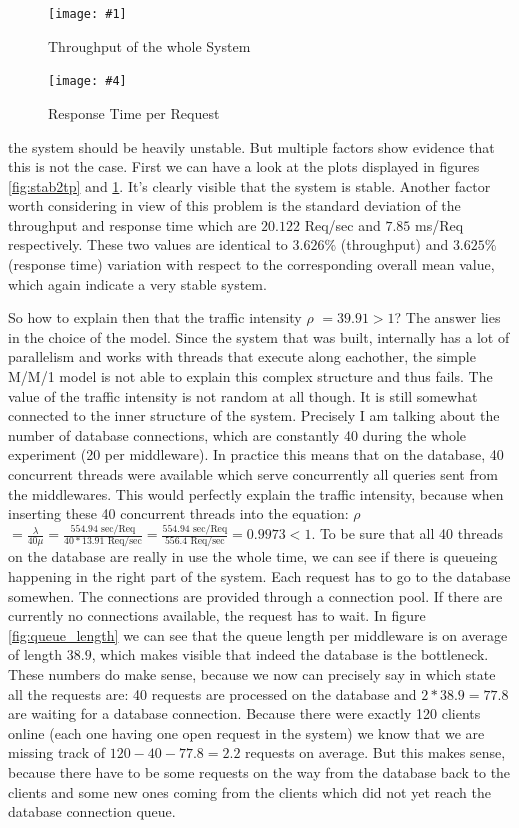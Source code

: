 \documentclass[11pt]{article}
\newcommand\TwoFig[6]{%
	\sbox\IBoxA{\texttt{[image: \#1]}}
	\sbox\IBoxB{\texttt{[image: \#4]}}%
	\ifdim\ht\IBoxA>\ht\IBoxB
	\setlength\IHeight{\ht\IBoxB}\else\setlength\IHeight{\ht\IBoxA}\fi%
	\begin{figure}[!htb]
		\minipage[t]{0.5\textwidth}\centering
		\texttt{[image: \#1]}
		\caption{#2}\label{#3}
		\endminipage \hfill
		\minipage[t]{0.5\textwidth}\centering
		\texttt{[image: \#4]}
		\caption{#5}\label{#6}
		\endminipage
	\end{figure}%
}
\begin{document}
\TwoFig {figures/stability_2/tp.eps} {Throughput of the whole System} {fig:stab2tp}
		{figures/stability_2/rt.eps} {Response Time per Request} {fig:stab2rt}
the system should be heavily unstable. But multiple factors show evidence that this is not the case. First we can have a look at the plots displayed in figures \ref{fig:stab2tp} and \ref{fig:stab2rt}. It's clearly visible that the system is stable. Another factor worth considering in view of this problem is the standard deviation of the throughput and response time which are $20.122$ Req/sec and $7.85$ ms/Req respectively. These two values are identical to $3.626\%$ (throughput) and $3.625\%$ (response time) variation with respect to the corresponding overall mean value, which again indicate a very stable system.

So how to explain then that the traffic intensity $\rho$ $=39.91>1$? The answer lies in the choice of the model. Since the system that was built, internally has a lot of parallelism and works with threads that execute along eachother, the simple M/M/1 model is not able to explain this complex structure and thus fails. The value of the traffic intensity is not random at all though. It is still somewhat connected to the inner structure of the system. Precisely I am talking about the number of database connections, which are constantly 40 during the whole experiment (20 per middleware). In practice this means that on the database, 40 concurrent threads were available which serve concurrently all queries sent from the middlewares. This would perfectly explain the traffic intensity, because when inserting these 40 concurrent threads into the equation: $\rho$ $=\frac{\lambda}{40\mu}=\frac{554.94 \text{ sec/Req}}{40*13.91\text{ Req/sec}}=\frac{554.94 \text{ sec/Req}}{556.4 \text{ Req/sec}}=0.9973<1$. To be sure that all 40 threads on the database are really in use the whole time, we can see if there is queueing happening in the right part of the system. Each request has to go to the database somewhen. The connections are provided through a connection pool. If there are currently no connections available, the request has to wait. In figure \ref{fig:queue_length} we can see that the queue length per middleware is on average of length $38.9$, which makes visible that indeed the database is the bottleneck. These numbers do make sense, because we now can precisely say in which state all the requests are: 40 requests are processed on the database and $2*38.9=77.8$ are waiting for a database connection. Because there were exactly 120 clients online (each one having one open request in the system) we know that we are missing track of $120-40-77.8=2.2$ requests on average. But this makes sense, because there have to be some requests on the way from the database back to the clients and some new ones coming from the clients which did not yet reach the database connection queue.
\end{document}
